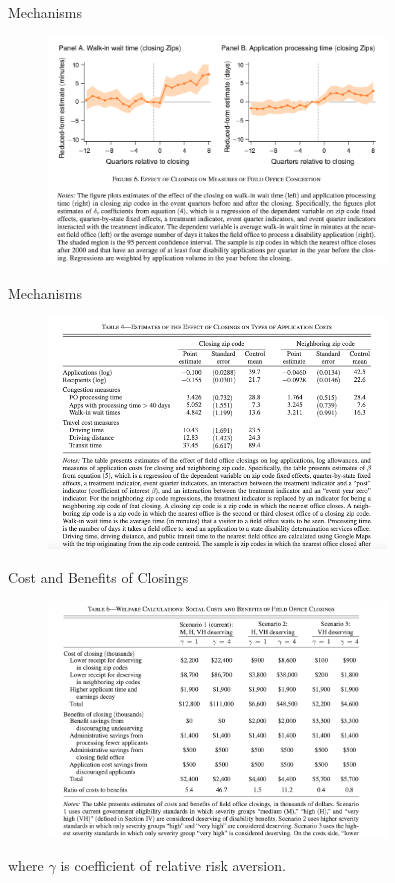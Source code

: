 \documentclass{beamer}
\begin{document}
\begin{frame}{Mechanisms}
    \begin{figure}
        \centering
        \includegraphics[width=0.8\textwidth]{F6.png}
    \end{figure}
\end{frame}

\begin{frame}{Mechanisms}
    \begin{figure}
        \centering
        \includegraphics[width=0.8\textwidth]{T4.png}
    \end{figure}
\end{frame}


\begin{frame}{Cost and Benefits of Closings}
    \begin{figure}
        \centering
        \includegraphics[width=0.8\textwidth]{T6.png}
    \end{figure}
    where $\gamma$ is coefficient of relative risk aversion.
\end{frame}
\end{document}
